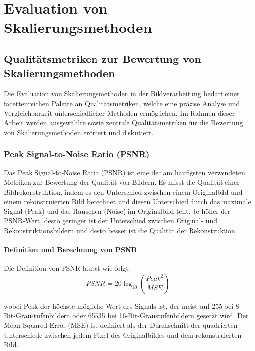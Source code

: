 

\chapter{Evaluation von Skalierungsmethoden}

\section{Qualitätsmetriken zur Bewertung von Skalierungsmethoden}

    Die Evaluation von Skalierungsmethoden in der Bildverarbeitung bedarf einer facettenreichen Palette an Qualitätsmetriken, welche eine präzise Analyse und Vergleichbarkeit unterschiedlicher Methoden ermöglichen. 
    Im Rahmen dieser Arbeit werden ausgewählte sowie zentrale Qualitätsmetriken für die Bewertung von Skalierungsmethoden erörtert und diskutiert.

    \subsection{Peak Signal-to-Noise Ratio (PSNR)}
        Das Peak Signal-to-Noise Ratio (PSNR) ist eine der am häufigsten verwendeten Metriken zur Bewertung der Qualität von Bildern. 
        Es misst die Qualität einer Bildrekonstruktion, indem es den Unterschied zwischen einem Originalbild und einem rekonstruierten Bild berechnet und diesen Unterschied durch das maximale Signal (Peak) und das Rauschen (Noise) im Originalbild teilt. 
        Je höher der PSNR-Wert, desto geringer ist der Unterschied zwischen Original- und Rekonstruktionsbildern und desto besser ist die Qualität der Rekonstruktion.
        
        \subsubsection{Definition und Berechnung von \ac{PSNR}}
            Die Definition von PSNR lautet wie folgt:
            \begin{equation}
            PSNR = 20 \log_{10} \left( \frac{Peak^2}{MSE} \right) 
            \end{equation}
            
            wobei Peak der höchste mögliche Wert des Signals ist, der meist auf 255 bei 8-Bit-Graustufenbildern oder 65535 bei 16-Bit-Graustufenbildern gesetzt wird. %
            Der Mean Squared Error (MSE) ist definiert als der Durchschnitt der quadrierten Unterschiede zwischen jedem Pixel des Originalbildes und dem rekonstruierten Bild.

